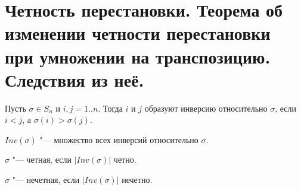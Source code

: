 \section{Четность перестановки. Теорема об изменении четности перестановки при умножении на транспозицию. Следствия из неё.}

\begin{Def}
Пусть $\sigma \in S_n$ и $i, j = 1..n$. Тогда $i$ и $j$ образуют инверсию относительно $\sigma$, если $i < j$, а $\sigma(i) > \sigma(j)$.
\end{Def}
\begin{Def}
$Inv(\sigma)$ "--- множество всех инверсий относительно $\sigma$.
\end{Def}
\begin{Def}
$\sigma$ "--- четная, если $|Inv(\sigma)|$ четно.
\end{Def}
\begin{Def}
$\sigma$ "--- нечетная, если $|Inv(\sigma)|$ нечетно.
\end{Def}


